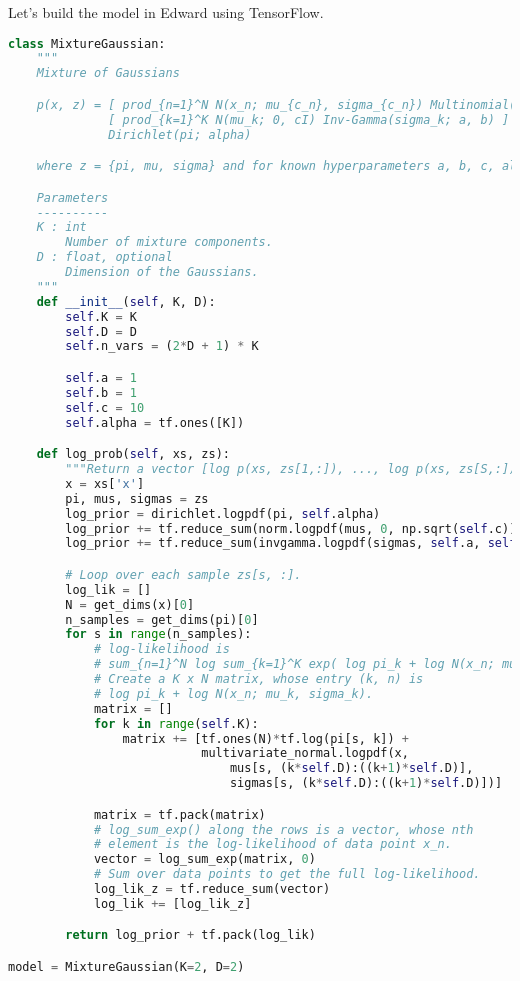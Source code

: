 Let's build the model in Edward using TensorFlow.
\begin{lstlisting}[language=Python]
class MixtureGaussian:
    """
    Mixture of Gaussians

    p(x, z) = [ prod_{n=1}^N N(x_n; mu_{c_n}, sigma_{c_n}) Multinomial(c_n; pi) ]
              [ prod_{k=1}^K N(mu_k; 0, cI) Inv-Gamma(sigma_k; a, b) ]
              Dirichlet(pi; alpha)

    where z = {pi, mu, sigma} and for known hyperparameters a, b, c, alpha.

    Parameters
    ----------
    K : int
        Number of mixture components.
    D : float, optional
        Dimension of the Gaussians.
    """
    def __init__(self, K, D):
        self.K = K
        self.D = D
        self.n_vars = (2*D + 1) * K

        self.a = 1
        self.b = 1
        self.c = 10
        self.alpha = tf.ones([K])

    def log_prob(self, xs, zs):
        """Return a vector [log p(xs, zs[1,:]), ..., log p(xs, zs[S,:])]."""
        x = xs['x']
        pi, mus, sigmas = zs
        log_prior = dirichlet.logpdf(pi, self.alpha)
        log_prior += tf.reduce_sum(norm.logpdf(mus, 0, np.sqrt(self.c)), 1)
        log_prior += tf.reduce_sum(invgamma.logpdf(sigmas, self.a, self.b), 1)

        # Loop over each sample zs[s, :].
        log_lik = []
        N = get_dims(x)[0]
        n_samples = get_dims(pi)[0]
        for s in range(n_samples):
            # log-likelihood is
            # sum_{n=1}^N log sum_{k=1}^K exp( log pi_k + log N(x_n; mu_k, sigma_k) )
            # Create a K x N matrix, whose entry (k, n) is
            # log pi_k + log N(x_n; mu_k, sigma_k).
            matrix = []
            for k in range(self.K):
                matrix += [tf.ones(N)*tf.log(pi[s, k]) +
                           multivariate_normal.logpdf(x,
                               mus[s, (k*self.D):((k+1)*self.D)],
                               sigmas[s, (k*self.D):((k+1)*self.D)])]

            matrix = tf.pack(matrix)
            # log_sum_exp() along the rows is a vector, whose nth
            # element is the log-likelihood of data point x_n.
            vector = log_sum_exp(matrix, 0)
            # Sum over data points to get the full log-likelihood.
            log_lik_z = tf.reduce_sum(vector)
            log_lik += [log_lik_z]

        return log_prior + tf.pack(log_lik)

model = MixtureGaussian(K=2, D=2)
\end{lstlisting}


